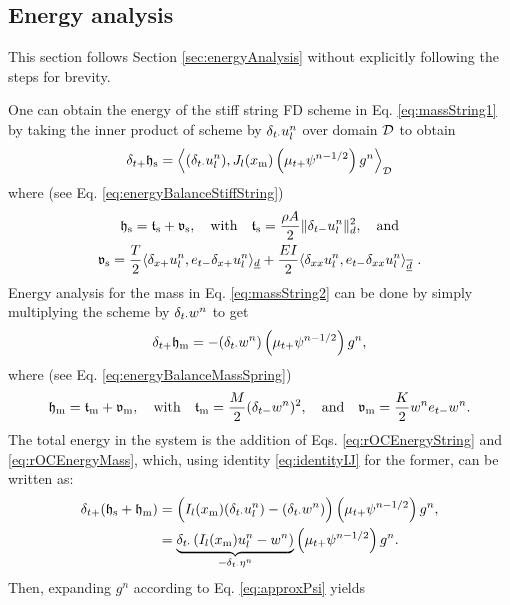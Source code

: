 \subsection{Energy analysis}
This section follows Section \ref{sec:energyAnalysis} without explicitly following the steps for brevity. 

One can obtain the energy of the stiff string FD scheme in Eq. \eqref{eq:massString1} by taking the inner product of scheme by $\delta_{t\cdot} u_l^n$ over domain $\mathcal{D}$ to obtain 
\begin{equation}\label{eq:rOCEnergyString}
    \delta_{t+} \mathfrak{h}_\text{s} = \left\langle (\delta_{t\cdot} u_l^n), J_l(x_\text{m})\left(\mu_{t+} \psi^{n-1/2}\right)g^n\right\rangle_{\mathcal{D}}
\end{equation}
where (see Eq. \eqref{eq:energyBalanceStiffString})
\begin{equation*}
    \begin{gathered}
        \mathfrak{h}_\text{s} = \mathfrak{t}_\text{s} + \mathfrak{v}_\text{s}, \quad \text{with} \quad \mathfrak{t}_\text{s} = \frac{\rho A}{2}\lVert\delta_{t-} u_l^n\rVert^2_d,\quad \text{and} \\
        \mathfrak{v}_\text{s} = \frac{T}{2}\langle\delta_{x+}u_l^n, e_{t-}\delta_{x+}u_l^n\rangle_{\underline{d}} + \frac{EI}{2}\langle\delta_{xx}u_l^n, e_{t-}\delta_{xx}u_l^n\rangle_{\overline{\underline{d}}}\ .
    \end{gathered}
\end{equation*}
Energy analysis for the mass in Eq. \eqref{eq:massString2} can be done by simply multiplying the scheme by $\delta_{t\cdot} w^n$ to get 
\begin{equation}\label{eq:rOCEnergyMass}
    \delta_{t+} \mathfrak{h}_\text{m} = -(\delta_{t\cdot} w^n)\left(\mu_{t+} \psi^{n-1/2}\right)g^n,
\end{equation}
where (see Eq. \eqref{eq:energyBalanceMassSpring})
\begin{equation*}
    \mathfrak{h}_\text{m} = \mathfrak{t}_\text{m} + \mathfrak{v}_\text{m}, \quad \text{with} \quad \mathfrak{t}_\text{m} = \frac{M}{2}(\delta_{t-} w^n)^2, \quad \text{and} \quad \mathfrak{v}_\text{m} = \frac{K}{2}w^n e_{t-}w^n.
\end{equation*}
The total energy in the system is the addition of Eqs. \eqref{eq:rOCEnergyString} and \eqref{eq:rOCEnergyMass}, which, using identity \eqref{eq:identityIJ} for the former, can be written as:
\begin{align*}
    \delta_{t+}(\mathfrak{h}_\text{s} + \mathfrak{h}_\text{m}) &= \Big(I_l(x_\text{m})(\delta_{t\cdot} u_l^n) - (\delta_{t\cdot} w^n)\Big)\left(\mu_{t+} \psi^{n-1/2}\right)g^n,\\
    &= \underbrace{\delta_{t\cdot}\left(I_l(x_\text{m})u_l^n - w^n\right)}_{-\delta_{t\cdot} \eta^n}\left(\mu_{t+} \psi^{n-1/2}\right)g^n.
\end{align*}
Then, expanding $g^n$ according to Eq. \eqref{eq:approxPsi} yields 
